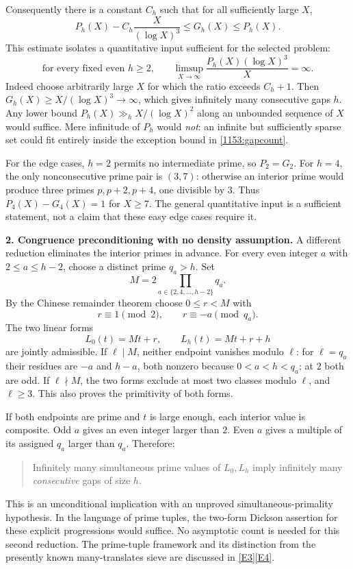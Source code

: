\documentclass[11pt,a4paper]{article}
\newcommand{\eref}[2]{\hyperlink{extra:#1:#2}{[E#2]}}
\numberwithin{equation}{section}
\begin{document}
Consequently there is a constant $C_h$ such that for all sufficiently large
$X$,
\begin{equation}\label{1153:gapcount}
 P_h(X)-C_h\frac{X}{(\log X)^3}\leq G_h(X)\leq P_h(X).
\end{equation}
This estimate isolates a quantitative input sufficient for the selected
problem:
\begin{equation}\label{1153:pairinput}
 \text{for every fixed even $h\geq2$,}\qquad
 \limsup_{X\to\infty}\frac{P_h(X)(\log X)^3}{X}=\infty.
\end{equation}
Indeed choose arbitrarily large $X$ for which the ratio exceeds $C_h+1$.
Then $G_h(X)\geq X/(\log X)^3\to\infty$, which gives infinitely many
consecutive gaps $h$. Any lower bound $P_h(X)\gg_h X/(\log X)^2$ along an
unbounded sequence of $X$ would suffice. Mere infinitude of $P_h$ would
\emph{not}: an infinite but sufficiently sparse set could fit entirely
inside the exception bound in \eqref{1153:gapcount}.

For the edge cases, $h=2$ permits no intermediate prime, so $P_2=G_2$.
For $h=4$, the only nonconsecutive prime pair is $(3,7)$: otherwise an
interior prime would produce three primes $p,p+2,p+4$, one divisible by $3$.
Thus $P_4(X)-G_4(X)=1$ for $X\geq7$. The general quantitative input is a
sufficient statement, not a claim that these easy edge cases require it.

\medskip
\textbf{2. Congruence preconditioning with no density assumption.}
A different reduction eliminates the interior primes in advance. For every
even integer $a$ with $2\leq a\leq h-2$, choose a distinct prime $q_a>h$.
Set
\[
 M=2\prod_{a\in\{2,4,\ldots,h-2\}}q_a.
\]
By the Chinese remainder theorem choose $0\leq r<M$ with
\begin{equation}\label{1153:crt}
 r\equiv1\pmod2,\qquad r\equiv-a\pmod{q_a}.
\end{equation}
The two linear forms
\[
 L_0(t)=Mt+r,\qquad L_h(t)=Mt+r+h
\]
are jointly admissible. If $\ell\mid M$, neither endpoint vanishes modulo
$\ell$: for $\ell=q_a$ their residues are $-a$ and $h-a$, both nonzero
because $0<a<h<q_a$; at $2$ both are odd. If $\ell\nmid M$, the two forms
exclude at most two classes modulo $\ell$, and $\ell\geq3$. This also proves
the primitivity of both forms.

If both endpoints are prime and $t$ is large enough, each interior value
is composite. Odd $a$ gives an even integer larger than $2$. Even $a$ gives
a multiple of its assigned $q_a$ larger than $q_a$. Therefore:
\begin{quote}
Infinitely many simultaneous prime values of $L_0,L_h$ imply infinitely
many \emph{consecutive} gaps of size $h$.
\end{quote}
This is an unconditional implication with an unproved simultaneous-primality
hypothesis. In the language of prime tuples, the two-form Dickson assertion
for these explicit progressions would suffice. No asymptotic count is needed
for this second reduction. The prime-tuple framework and its distinction
from the presently known many-translates sieve are discussed in
\eref{1153}{3}\eref{1153}{4}.
\end{document}
